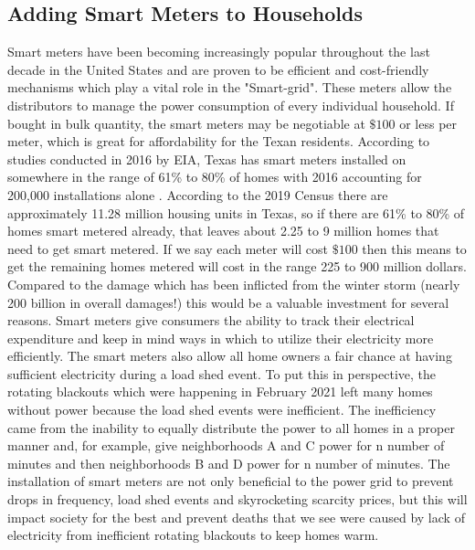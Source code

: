 \documentclass[12pt]{article}
\begin{document}
\subsection{Adding Smart Meters to Households}
\indent
\indent Smart meters have been becoming increasingly popular throughout the last decade in the United States and are proven to be efficient and cost-friendly mechanisms which play a vital role in the "Smart-grid". These meters allow the distributors to manage the power consumption of every individual household. If bought in bulk quantity, the smart meters may be negotiable at $\$100$ or less per meter, which is great for affordability for the Texan residents. According to studies conducted in 2016 by EIA, Texas has smart meters installed on somewhere in the range of 61\% to 80\% of homes with 2016 accounting for 200,000 installations alone \cite{smartMeterdata}. According to the 2019 Census there are approximately 11.28 million housing units in Texas, so if there are 61\% to 80\% of homes smart metered already, that leaves about 2.25 to 9 million homes that need to get smart metered. If we say each meter will cost $\$100$ then this means to get the remaining homes metered will cost in the range 225 to 900 million dollars. Compared to the damage which has been inflicted from the winter storm (nearly 200 billion in overall damages!) this would be a valuable investment for several reasons. Smart meters give consumers the ability to track their electrical expenditure and keep in mind ways in which to utilize their electricity more efficiently. The smart meters also allow all home owners a fair chance at having sufficient electricity during a load shed event. To put this in perspective, the rotating blackouts which were happening in February 2021 left many homes without power because the load shed events were inefficient. The inefficiency came from the inability to equally distribute the power to all homes in a proper manner and, for example, give neighborhoods A and C power for n number of minutes and then neighborhoods B and D power for n number of minutes. The installation of smart meters are not only beneficial to the power grid to prevent drops in frequency, load shed events and skyrocketing scarcity prices, but this will impact society for the best and prevent deaths that we see were caused by lack of electricity from inefficient rotating blackouts to keep homes warm. 
\end{document}
